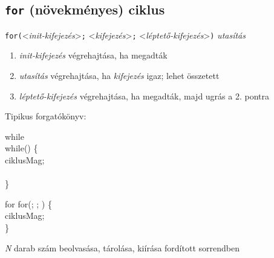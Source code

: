\documentclass[usenames,dvipsnames,aspectratio=169]{beamer}
\begin{document}
\subsection{\texttt{for} (növekményes) ciklus}
\begin{frame}
  \scriptsize
  \texttt{for(}<\emph{init-kifejezés}>\texttt{;} <\emph{kifejezés}>\texttt{;} <\emph{léptető-kifejezés}>\texttt{)} 
\emph{utasítás}
  \begin{enumerate}
    \item \emph{init-kifejezés} végrehajtása, ha megadták
    \item \emph{utasítás} végrehajtása, ha \emph{kifejezés} igaz; lehet összetett
    \item \emph{léptető-kifejezés} végrehajtása, ha megadták, majd ugrás a 2. pontra
  \end{enumerate}
  \vfill
  Tipikus forgatókönyv:
  \begin{exampleblock}{while}
    \\
    while() \{\\
      \hspace{0.5cm} ciklusMag;\\
      \hspace{0.5cm} \\
    \}\\
  \end{exampleblock}
  \begin{exampleblock}{for}
    for(; ; ) \{\\
      \hspace{0.5cm} ciklusMag;\\
    \}\\
  \end{exampleblock}
\end{frame}

\begin{frame}
  \emph{N} darab szám beolvasása, tárolása, kiírása fordított sorrendben
  \begin{columns}[T]
      \begin{exampleblock}{}
        \scriptsize
        
      \end{exampleblock}
      \begin{exampleblock}{}
        \scriptsize
        
      \end{exampleblock}
  \end{columns}
\end{frame}
\end{document}
